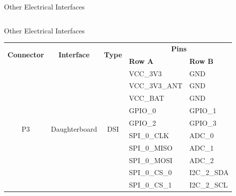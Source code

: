 \begin{frame}{Other Electrical Interfaces}
\begin{table}[!htb]
\begin{tabular}{cccl}
            \bottomrule[1.5pt]
        \end{tabular}
    \end{table}

\end{frame}

\begin{frame}{Other Electrical Interfaces}

    \begin{table}[!htb]\tiny
        \centering
        \begin{tabular}{cccll}
            \toprule[1.5pt]
            \multirow{2}{*}{\textbf{Connector}} & \multirow{2}{*}{\textbf{Interface}} & \multirow{2}{*}{\textbf{Type}} & \multicolumn{2}{c}{\textbf{Pins}} \\
                                                &                                     &                                & \textbf{Row A} & \textbf{Row B} \\
            \midrule
            \multirow{10}{*}{P3} & \multirow{10}{*}{Daughterboard} & \multirow{10}{*}{DSI} & VCC\_3V3       & GND \\
                                 &                                 &                       & VCC\_3V3\_ANT  & GND \\
                                 &                                 &                       & VCC\_BAT       & GND \\
                                 &                                 &                       & GPIO\_0        & GPIO\_1\\
                                 &                                 &                       & GPIO\_2        & GPIO\_3\\
                                 &                                 &                       & SPI\_0\_CLK    & ADC\_0 \\
                                 &                                 &                       & SPI\_0\_MISO   & ADC\_1 \\
                                 &                                 &                       & SPI\_0\_MOSI   & ADC\_2 \\
                                 &                                 &                       & SPI\_0\_CS\_0  & I2C\_2\_SDA \\
                                 &                                 &                       & SPI\_0\_CS\_1  & I2C\_2\_SCL \\
            \bottomrule[1.5pt]
        \end{tabular}
    \end{table}

\end{frame}

